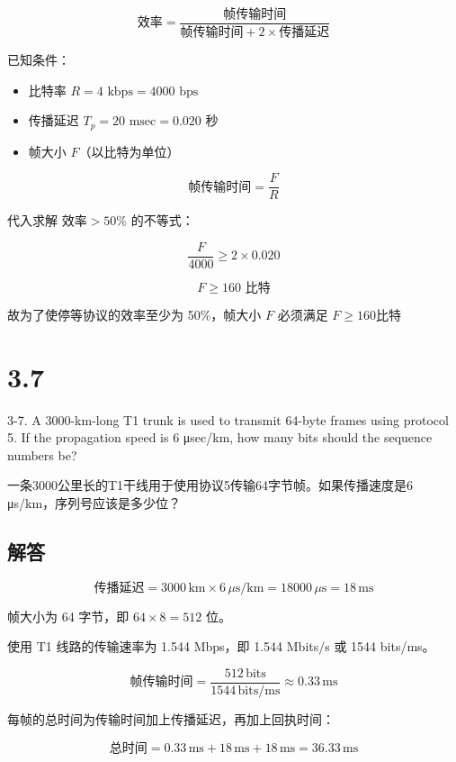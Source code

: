 \[
\text{效率} = \frac{\text{帧传输时间}}{\text{帧传输时间} + 2 \times \text{传播延迟}}
\]

已知条件：

\begin{itemize}
  \item 比特率 \( R = 4 \text{ kbps} = 4000 \text{ bps} \)
  \item 传播延迟 \( T_p = 20 \text{ msec} = 0.020 \text{ 秒} \)
  \item 帧大小 \( F \)（以比特为单位）
\end{itemize}

\[
\text{帧传输时间} = \frac{F}{R}
\]

代入求解 $\text{效率} > 50\% $ 的不等式：

\[
\frac{F}{4000} \geq 2 \times 0.020
\]

\[
F \geq 160 \text{ 比特}
\]

故为了使停等协议的效率至少为 50\%，帧大小 \( F \) 必须满足 $ F \geq 160 \text{比特} $

\section{3.7}

3-7. A 3000-km-long T1 trunk is used to transmit 64-byte frames using protocol 5. If the propagation speed is 6 μsec/km, how many bits should the sequence numbers be?

一条3000公里长的T1干线用于使用协议5传输64字节帧。如果传播速度是6 μs/km，序列号应该是多少位？

\subsection*{解答}

   \[
   \text{传播延迟} = 3000 \, \text{km} \times 6 \, \mu\text{s/km} = 18000 \, \mu\text{s} = 18 \, \text{ms}
   \]

   帧大小为 64 字节，即 \(64 \times 8 = 512\) 位。

   使用 T1 线路的传输速率为 1.544 Mbps，即 1.544 Mbits/s 或 1544 bits/ms。

   \[
   \text{帧传输时间} = \frac{512 \, \text{bits}}{1544 \, \text{bits/ms}} \approx 0.33 \, \text{ms}
   \]

   每帧的总时间为传输时间加上传播延迟，再加上回执时间：

   \[
   \text{总时间} = 0.33 \, \text{ms} + 18 \, \text{ms} + 18 \, \text{ms} = 36.33 \, \text{ms}
   \]

